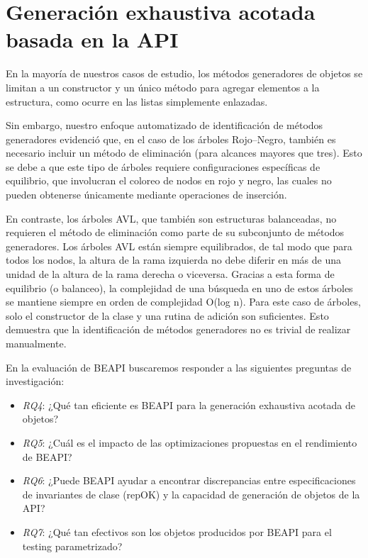 

\section{Generación exhaustiva acotada basada en la API}
\label{sec:experimentalBeapi}


En la mayoría de nuestros casos de estudio, los métodos generadores de objetos se limitan a un 
constructor y un único método para agregar elementos a la estructura, como ocurre en las listas 
simplemente enlazadas.  

Sin embargo, nuestro enfoque automatizado de identificación de métodos generadores evidenció que, 
en el caso de los árboles Rojo–Negro, también es necesario incluir un método de eliminación 
(para alcances mayores que tres).  
Esto se debe a que este tipo de árboles requiere configuraciones específicas de equilibrio, 
que involucran el coloreo de nodos en rojo y negro, las cuales no pueden obtenerse únicamente 
mediante operaciones de inserción.

En contraste, los árboles AVL,
que también son estructuras balanceadas, no requieren el método de eliminación como parte de su subconjunto de métodos generadores.
Los árboles AVL están siempre equilibrados, 
de tal modo que para todos los nodos, la altura de la rama izquierda no debe diferir en más de una unidad de la altura de la rama derecha o viceversa. 
Gracias a esta forma de equilibrio (o balanceo), la complejidad de una búsqueda en uno de estos árboles se mantiene siempre en orden de complejidad O(log n). 
Para este caso de árboles, solo el constructor de la clase y una rutina de adición son suficientes. 
Esto demuestra que la identificación de métodos generadores no es trivial de realizar manualmente.




En la evaluación de BEAPI buscaremos responder a las siguientes preguntas de
investigación:

\begin{itemize}
\item \emph{RQ4}: ¿Qué tan eficiente es BEAPI para la generación exhaustiva                                                                                       
    acotada de objetos?
\item\emph{RQ5}: ¿Cuál es el impacto de las optimizaciones propuestas en el
    rendimiento de BEAPI?
\item\emph{RQ6}: ¿Puede BEAPI ayudar a encontrar discrepancias entre
    especificaciones de invariantes de clase (repOK) y la capacidad de generación de objetos de la API?
\item\emph{RQ7}: ¿Qué tan efectivos son los objetos producidos por BEAPI para el
    testing parametrizado?  
\end{itemize}

